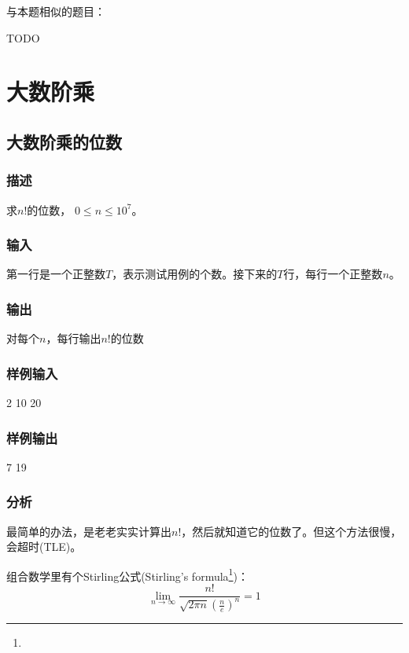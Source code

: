 与本题相似的题目：
\begindot
\item  TODO
\myenddot


\section{大数阶乘} %

\subsection{大数阶乘的位数} %
\subsubsection{描述}
求$n!$的位数， $0 \leq n \leq 10^7$。

\subsubsection{输入}
第一行是一个正整数$T$，表示测试用例的个数。接下来的$T$行，每行一个正整数$n$。

\subsubsection{输出}
对每个$n$，每行输出$n!$的位数

\subsubsection{样例输入}
\begin{Code}
2
10
20
\end{Code}

\subsubsection{样例输出}
\begin{Code}
7
19
\end{Code}

\subsubsection{分析}
最简单的办法，是老老实实计算出$n!$，然后就知道它的位数了。但这个方法很慢，会超时(TLE)。

组合数学里有个Stirling公式(Stirling's formula\footnote{})：
$$
\lim_{n \to \infty}{\dfrac{n!}{\sqrt{2\pi n}\left(\frac{n}{e} \right)^n}}=1
$$


